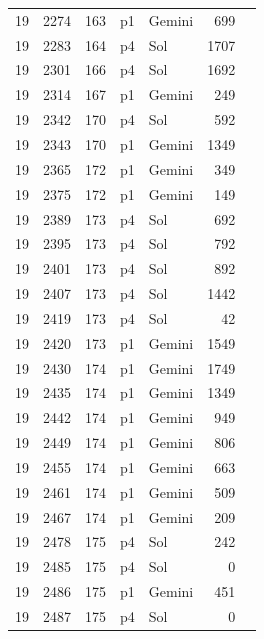 \begin{longtable}{r r r l l r L{2.3in}}
19 & 2274 & 163 & p1 & Gemini & 699 &  \\
19 & 2283 & 164 & p4 & Sol & 1707 &  \\
19 & 2301 & 166 & p4 & Sol & 1692 &  \\
19 & 2314 & 167 & p1 & Gemini & 249 &  \\
19 & 2342 & 170 & p4 & Sol & 592 &  \\
19 & 2343 & 170 & p1 & Gemini & 1349 &  \\
19 & 2365 & 172 & p1 & Gemini & 349 &  \\
19 & 2375 & 172 & p1 & Gemini & 149 &  \\
19 & 2389 & 173 & p4 & Sol & 692 &  \\
19 & 2395 & 173 & p4 & Sol & 792 &  \\
19 & 2401 & 173 & p4 & Sol & 892 &  \\
19 & 2407 & 173 & p4 & Sol & 1442 &  \\
19 & 2419 & 173 & p4 & Sol & 42 &  \\
19 & 2420 & 173 & p1 & Gemini & 1549 &  \\
19 & 2430 & 174 & p1 & Gemini & 1749 &  \\
19 & 2435 & 174 & p1 & Gemini & 1349 &  \\
19 & 2442 & 174 & p1 & Gemini & 949 &  \\
19 & 2449 & 174 & p1 & Gemini & 806 &  \\
19 & 2455 & 174 & p1 & Gemini & 663 &  \\
19 & 2461 & 174 & p1 & Gemini & 509 &  \\
19 & 2467 & 174 & p1 & Gemini & 209 &  \\
19 & 2478 & 175 & p4 & Sol & 242 &  \\
19 & 2485 & 175 & p4 & Sol & 0 &  \\
19 & 2486 & 175 & p1 & Gemini & 451 &  \\
19 & 2487 & 175 & p4 & Sol & 0 &  \\
\end{longtable}
\endgroup
{}
